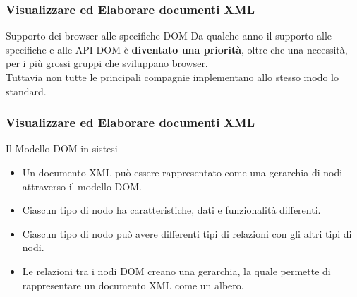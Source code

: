 \begin{frame}
    \frametitle{Visualizzare ed Elaborare documenti XML}
    \addtocounter{nframe}{1}
    

     \begin{block}{Supporto dei browser alle specifiche DOM}
        Da qualche anno il supporto alle specifiche e alle API DOM è \textbf{diventato una priorità}, oltre che una necessità, per i più grossi gruppi che sviluppano browser.
        \\ Tuttavia non tutte le principali compagnie implementano allo stesso modo lo standard.
     \end{block}
     
\end{frame}


\begin{frame}
    \frametitle{Visualizzare ed Elaborare documenti XML}
    \addtocounter{nframe}{1}
    
     \begin{block}{Il Modello DOM in sistesi}
        \begin{itemize}
            \item Un documento XML può essere rappresentato come una gerarchia di nodi attraverso il modello DOM.
            \item Ciascun tipo di nodo ha caratteristiche, dati e funzionalità differenti.
            \item Ciascun tipo di nodo può avere differenti tipi di relazioni con gli altri tipi di nodi.
            \item Le relazioni tra i nodi DOM creano una gerarchia, la quale permette di rappresentare un documento XML come un albero.
        \end{itemize}
     \end{block}
     
\end{frame}

